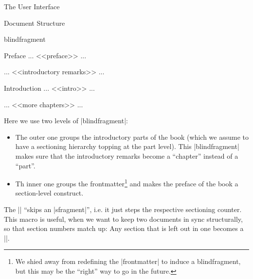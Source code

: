 \begin{sfragment}[id=sec:user]{The User Interface}
\begin{sfragment}[id=sec:user:struct]{Document Structure}
\begin{environment}{blindfragment}
\begin{latexcode}

\begin{blindfragment}
\begin{blindfragment}
\begin{frontmatter}
\maketitle\newpage
\begin{sfragment}{Preface}
... <<preface>> ...
\end{sfragment}
\clearpage\setcounter{tocdepth}{4}\tableofcontents\clearpage
\end{frontmatter}
\end{blindfragment}
... <<introductory remarks>> ...
\end{blindfragment}
\begin{sfragment}{Introduction}
... <<intro>> ...
\end{sfragment}
... <<more chapters>> ... 


\end{latexcode}

Here we use two levels of |blindfragment|:
\begin{itemize}
\item The outer one groups the introductory parts of the book (which we assume to have a
  sectioning hierarchy topping at the part level). This |blindfragment| makes sure that
  the introductory remarks become a ``chapter'' instead of a ``part''.
\item Th inner one groups the frontmatter\footnote{We shied away from redefining the
    |frontmatter| to induce a blindfragment, but this may be the ``right'' way to go in
    the future.} and makes the preface of the book a section-level construct.
\end{itemize}
\end{environment}

\begin{function}{\skipfragment}
  The |\skipfragment| ``skips an |sfragment|'', i.e. it just steps the respective sectioning
  counter. This macro is useful, when we want to keep two documents in sync structurally,
  so that section numbers match up: Any section that is left out in one becomes a
  |\skipfragment|.
\end{function}


\end{sfragment}
\end{sfragment}
